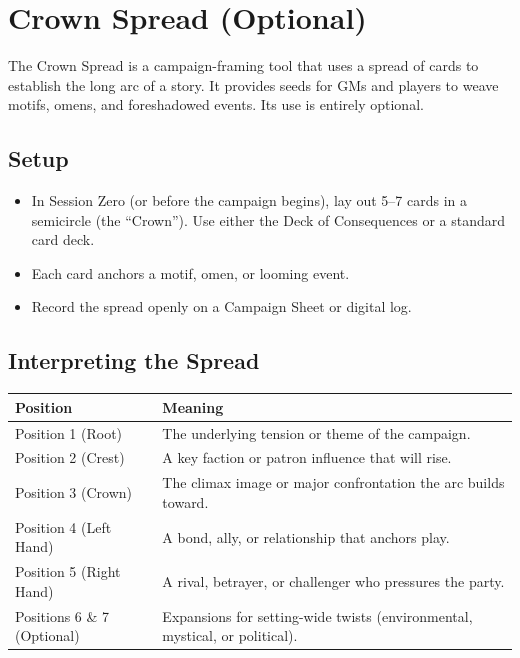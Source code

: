 
\section{Crown Spread (Optional)}

The Crown Spread is a campaign-framing tool that uses a spread of cards to establish the long arc of a story. It provides seeds for GMs and players to weave motifs, omens, and foreshadowed events. Its use is entirely optional.

\subsection{Setup}

\begin{itemize}
  \item In Session Zero (or before the campaign begins), lay out 5--7 cards in a semicircle (the ``Crown''). Use either the Deck of Consequences or a standard card deck.
  \item Each card anchors a motif, omen, or looming event.
  \item Record the spread openly on a Campaign Sheet or digital log.
\end{itemize}

\subsection{Interpreting the Spread}

\begin{tabular}{@{}lp{10cm}@{}}
\toprule
\textbf{Position} & \textbf{Meaning} \\
\midrule
Position 1 (Root) & The underlying tension or theme of the campaign. \\
Position 2 (Crest) & A key faction or patron influence that will rise. \\
Position 3 (Crown) & The climax image or major confrontation the arc builds toward. \\
Position 4 (Left Hand) & A bond, ally, or relationship that anchors play. \\
Position 5 (Right Hand) & A rival, betrayer, or challenger who pressures the party. \\
Positions 6 \& 7 (Optional) & Expansions for setting-wide twists (environmental, mystical, or political). \\
\bottomrule
\end{tabular}

